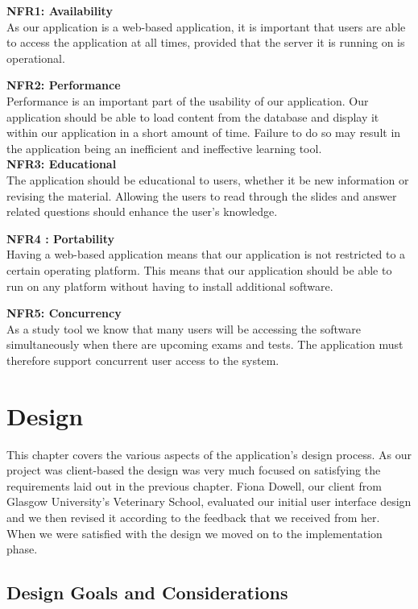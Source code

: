 \documentclass{l3proj}
\begin{document}
\textbf{ NFR1: Availability}\\
As our application is a web-based application, it is important that users are able to access the application at all times, provided that the server it is running on is operational.

\textbf{NFR2: Performance}\\
Performance is an important part of the usability of our application. Our application should be able to load content from the database and display it within our application in a short amount of time. Failure to do so may result in the application being an inefficient and ineffective learning tool.\\

\textbf{ NFR3: Educational}\\
The application should be educational to users, whether it be new information or revising the material. Allowing the users to read through the slides and answer related questions should enhance the user's knowledge.

\textbf{ NFR4 : Portability}\\
Having a web-based application means that our application is not restricted to a certain operating platform. This means that our application should be able to run on any platform without having to install additional software.

\textbf{ NFR5: Concurrency}\\
As a study tool we know that many users will be accessing the software simultaneously when there are upcoming exams and tests. The application must therefore support concurrent user access to the system.

\chapter{Design}
\label{design}

This chapter covers the various aspects of the application's design process. As our project was client-based the design was very much focused on satisfying the requirements laid out in the previous chapter. Fiona Dowell, our client from Glasgow University's Veterinary School, evaluated our initial user interface design and we then revised it according to the feedback that we received from her. When we were satisfied with the design we moved on to the implementation phase.

\section{Design Goals and Considerations}
\end{document}
